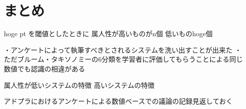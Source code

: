 \section{まとめ}


hoge pt を閾値としたときに
属人性が高いものがn個
低いものhoge個

・アンケートによって執筆すべきとされるシステムを洗い出すことが出来た
・ただブルーム・タキソノミーの6分類を学習者に評価してもらうことによる同じ数値でも認識の相違がある


属人性が低いシステムの特徴
高いシステムの特徴

アドプラにおけるアンケートによる数値ベースでの議論の記録見返しておく
